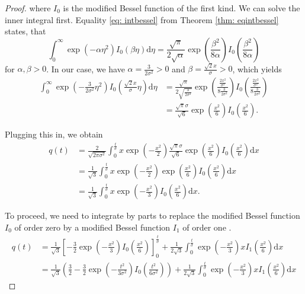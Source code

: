 \documentclass[a4paper,12pt]{article}
\theoremstyle{plain}
\theoremstyle{definition}
\numberwithin{equation}{section}
\begin{document}
\begin{proof}
	where $I_0$ is the modified Bessel function of the first kind. We can solve the inner integral first. Equality \eqref{eq: intbessel} from Theorem \ref{thm: eqintbessel} states, that
	\begin{equation*}
		\int_0^\infty \exp \left( - \alpha \eta^2 \right) I_0 ( \beta \eta ) \mathrm{d}\eta = \frac{\sqrt{\pi}}{2 \sqrt{\alpha}} \exp \left( \frac{\beta^2}{8 \alpha} \right) I_0 \left( \frac{\beta^2}{8 \alpha} \right)
	\end{equation*}
	for $\alpha, \beta > 0$. In our case, we have $\alpha = \frac{3}{2 \sigma^2} > 0$ and $\beta = \frac{\sqrt{2} x}{\sigma} > 0$, which yields
	\begin{align*}
		\int_0^\infty \exp \left( - \frac{3}{2 \sigma^2} \eta^2 \right) I_0 \left( \frac{\sqrt{2} x}{\sigma} \eta \right) \mathrm{d}\eta &= \frac{\sqrt{\pi}}{2 \sqrt{\frac{3}{2 \sigma^2}}} \exp \left( \frac{\frac{2 x^2}{\sigma^2}}{8 \frac{3}{2 \sigma^2}} \right) I_0 \left( \frac{\frac{2 x^2}{\sigma^2}}{8 \frac{3}{2 \sigma^2}} \right) \\
		&= \frac{\sqrt{\pi} \sigma}{\sqrt{6}} \exp \left( \frac{x^2}{6} \right) I_0 \left( \frac{x^2}{6} \right).
	\end{align*}
	
	Plugging this in, we obtain
	\begin{align*}
		q(t) &= \frac{2}{\sqrt{2 \pi \sigma^2}} \int_0^\frac{t}{\sigma} x \exp \left( - \frac{x^2}{2} \right) \frac{\sqrt{\pi} \sigma}{\sqrt{6}} \exp \left( \frac{x^2}{6} \right) I_0 \left( \frac{x^2}{6} \right) \mathrm{d}x \\
		&= \frac{1}{\sqrt{3}} \int_0^\frac{t}{\sigma} x \exp \left( - \frac{x^2}{2} \right) \exp \left( \frac{x^2}{6} \right) I_0 \left( \frac{x^2}{6} \right) \mathrm{d}x \\
		&= \frac{1}{\sqrt{3}} \int_0^\frac{t}{\sigma} x \exp \left( - \frac{x^2}{3} \right) I_0 \left( \frac{x^2}{6} \right) \mathrm{d}x.
	\end{align*}
	
	To proceed, we need to integrate by parts to replace the modified Bessel function $I_0$ of order zero by a modified Bessel function $I_1$ of order one \cite[p.~251]{HMF}.
	\begin{align*}
		q(t) &= \frac{1}{\sqrt{3}} \left[ - \frac{3}{2} \exp \left( - \frac{x^2}{3} \right) I_0 \left( \frac{x^2}{6} \right) \right]_0^\frac{t}{\sigma} + \frac{1}{2 \sqrt{3}} \int_0^\frac{t}{\sigma} \exp \left( - \frac{x^2}{3} \right) x I_1 \left( \frac{x^2}{6} \right) \mathrm{d}x \\
		&= \frac{1}{\sqrt{3}} \left( \frac{3}{2} - \frac{3}{2} \exp \left( - \frac{t^2}{3 \sigma^2} \right) I_0 \left( \frac{t^2}{6 \sigma^2} \right) \right) + \frac{1}{2 \sqrt{3}} \int_0^\frac{t}{\sigma} \exp \left( - \frac{x^2}{3} \right) x I_1 \left( \frac{x^2}{6} \right) \mathrm{d}x
	\end{align*}
	

\end{proof}
\end{document}
